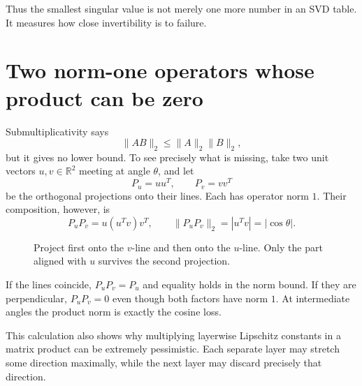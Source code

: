 Thus the smallest singular value is not merely one more number in an SVD table.  It measures how close invertibility is to failure.

\section{Two norm-one operators whose product can be zero}

Submultiplicativity says
\[
 \|AB\|_2\le\|A\|_2\|B\|_2,
\]
but it gives no lower bound. To see precisely what is missing, take two unit vectors $u,v\in\mathbb R^2$ meeting at angle $\theta$, and let
\[
 P_u=uu^T,\qquad P_v=vv^T
\]
be the orthogonal projections onto their lines. Each has operator norm $1$. Their composition, however, is
\[
 P_uP_v=u(u^Tv)v^T,
 \qquad
 \boxed{\|P_uP_v\|_2=|u^Tv|=|\cos\theta|.}
\]

\begin{figure}[H]
\centering
{}
\caption{Project first onto the $v$-line and then onto the $u$-line. Only the part aligned with $u$ survives the second projection.}
\end{figure}

If the lines coincide, $P_uP_v=P_u$ and equality holds in the norm bound. If they are perpendicular, $P_uP_v=0$ even though both factors have norm $1$. At intermediate angles the product norm is exactly the cosine loss.

This calculation also shows why multiplying layerwise Lipschitz constants in a matrix product can be extremely pessimistic. Each separate layer may stretch some direction maximally, while the next layer may discard precisely that direction.
